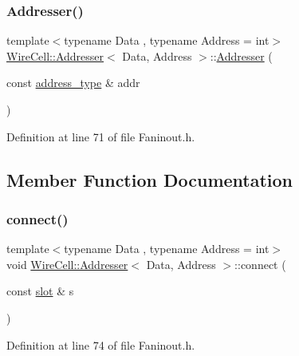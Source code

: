 \subsubsection{\texorpdfstring{Addresser()}{Addresser()}}
{\footnotesize\ttfamily template$<$typename Data , typename Address  = int$>$ \\
\hyperlink{class_wire_cell_1_1_addresser}{Wire\+Cell\+::\+Addresser}$<$ Data, Address $>$\+::\hyperlink{class_wire_cell_1_1_addresser}{Addresser} (\begin{DoxyParamCaption}\item[{const \hyperlink{class_wire_cell_1_1_addresser_af284800d5e9ccf8b92d3456888969e75}{address\+\_\+type} \&}]{addr }\end{DoxyParamCaption})\hspace{0.3cm}{\ttfamily [inline]}}



Definition at line 71 of file Faninout.\+h.



\subsection{Member Function Documentation}
\mbox{\label{class_wire_cell_1_1_addresser_ad391fb735381e4f23b37e45d9c18699c}} 
\subsubsection{\texorpdfstring{connect()}{connect()}}
{\footnotesize\ttfamily template$<$typename Data , typename Address  = int$>$ \\
void \hyperlink{class_wire_cell_1_1_addresser}{Wire\+Cell\+::\+Addresser}$<$ Data, Address $>$\+::connect (\begin{DoxyParamCaption}\item[{const \hyperlink{class_wire_cell_1_1_addresser_a3c52496ae06c731123d9d7d8ba426ac3}{slot} \&}]{s }\end{DoxyParamCaption})\hspace{0.3cm}{\ttfamily [inline]}}



Definition at line 74 of file Faninout.\+h.

\mbox{\label{class_wire_cell_1_1_addresser_a0ca706eb9f4e16fc5ebc8e8930683e3b}} 
